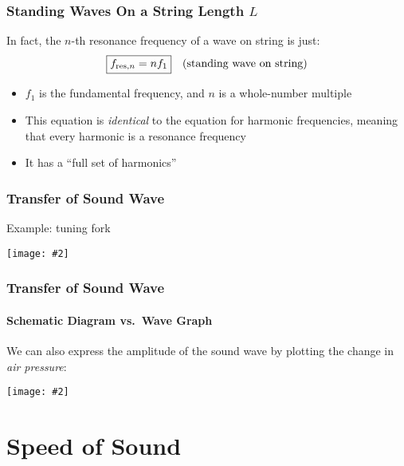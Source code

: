 \documentclass[12pt,aspectratio=169]{beamer}
\newcommand{\pic}[2]{\texttt{[image: \#2]}}
\begin{document}
\begin{frame}
  \frametitle{Standing Waves On a String Length $L$}

  In fact, the $n$-th resonance frequency of a wave on string is just:
  {\LARGE
    \begin{displaymath}
      \boxed{f_{\mathrm{res},n}=nf_1}\quad
      \text{\normalsize (standing wave on string)}
    \end{displaymath}
  }
  \begin{itemize}
  \item $f_1$ is the fundamental frequency, and $n$ is a whole-number multiple
  \item This equation is \emph{identical} to the equation for harmonic
    frequencies, meaning that every harmonic is a resonance frequency
  \item It has a ``full set of harmonics''
  \end{itemize}
\end{frame}


\begin{frame}
  \frametitle{Transfer of Sound Wave}
  Example: tuning fork
  
  \pic{.9}{tuningfork.jpg}
\end{frame}

\begin{frame}
  \frametitle{Transfer of Sound Wave}
  \framesubtitle{Schematic Diagram vs.\ Wave Graph}
  We can also express the amplitude of the sound wave by plotting the change in
  \emph{air pressure}:

  \vspace{-.2in}
  \begin{center}
    \pic{.9}{schematic-vs-graph.png}
  \end{center}
\end{frame}



\section[$v_s$]{Speed of Sound}
\end{document}
